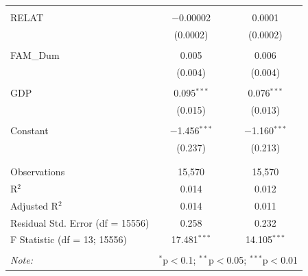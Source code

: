 \documentclass[a4paper]{article}\usepackage[]{graphicx}\usepackage[]{color}
\begin{document}
\begin{table}[!htbp]
\begin{tabular}{@{\extracolsep{5pt}}lcc}
  & & \\ 
 RELAT & $-$0.00002 & 0.0001 \\ 
  & (0.0002) & (0.0002) \\ 
  & & \\ 
 FAM\_Dum & 0.005 & 0.006 \\ 
  & (0.004) & (0.004) \\ 
  & & \\ 
 GDP & 0.095$^{***}$ & 0.076$^{***}$ \\ 
  & (0.015) & (0.013) \\ 
  & & \\ 
 Constant & $-$1.456$^{***}$ & $-$1.160$^{***}$ \\ 
  & (0.237) & (0.213) \\ 
  & & \\ 
\hline \\[-1.8ex] 
Observations & 15,570 & 15,570 \\ 
R$^{2}$ & 0.014 & 0.012 \\ 
Adjusted R$^{2}$ & 0.014 & 0.011 \\ 
Residual Std. Error (df = 15556) & 0.258 & 0.232 \\ 
F Statistic (df = 13; 15556) & 17.481$^{***}$ & 14.105$^{***}$ \\ 
\hline 
\hline \\[-1.8ex] 
\textit{Note:}  & \multicolumn{2}{r}{$^{*}$p$<$0.1; $^{**}$p$<$0.05; $^{***}$p$<$0.01} \\ 
\end{tabular} 
\end{table} 
\end{document}
